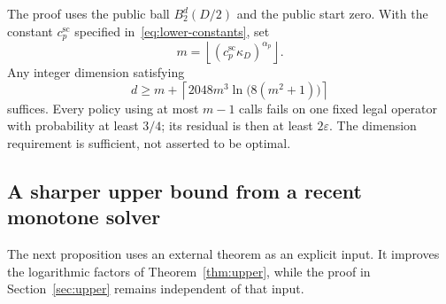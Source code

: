 \documentclass[11pt]{article}
\numberwithin{equation}{section}
\theoremstyle{definition}
\theoremstyle{remark}
\newcommand{\ap}{\alpha_p}
\begin{document}
The proof uses the public ball $B_2^d(D/2)$ and the public start zero.
With the constant $c_p^{\mathrm{sc}}$ specified
in~\eqref{eq:lower-constants}, set
\[
m=\left\lfloor(c_p^{\mathrm{sc}}\kappa_D)^{\ap}\right\rfloor.
\]
Any integer dimension satisfying
\[
d\ge m+\left\lceil2048m^3\ln\bigl(8(m^2+1)\bigr)\right\rceil
\]
suffices. Every policy using at most $m-1$ calls fails on one fixed legal
operator with probability at least $3/4$; its residual is then at least
$2\varepsilon$. The dimension requirement is sufficient, not asserted
to be optimal.

\subsection{A sharper upper bound from a recent monotone solver}
The next proposition uses an external theorem as an explicit input.
It improves the logarithmic factors of Theorem~\ref{thm:upper}, while
the proof in Section~\ref{sec:upper} remains independent of that input.
\end{document}
